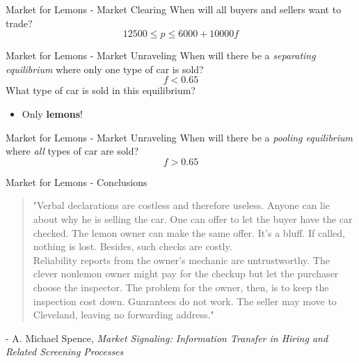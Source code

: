 
\begin{frame}{Market for Lemons - Market Clearing}
  When will all buyers and sellers want to trade?
  \pause
  $$12500 \leq p \leq 6000 + 10000f$$
\end{frame}


\begin{frame}{Market for Lemons - Market Unraveling}
  When will there be a \textit{separating equilibrium}
  where only one type of car is sold?
  \pause
  $$f < 0.65$$
  \pause
  What type of car is sold in this equilibrium?
  \begin{itemize}
    \item Only \textbf{lemons}!
  \end{itemize}
\end{frame}


\begin{frame}{Market for Lemons - Market Unraveling}
  When will there be a \textit{pooling equilibrium}
  where \textit{all} types of car are sold?
  \pause
  $$f > 0.65$$
  \pause
\end{frame}


\begin{frame}{Market for Lemons - Conclusions}
  \begin{quote}
    \small{
    "Verbal declarations are costless and therefore useless. Anyone can lie about why he is selling the car. 
    One can offer to let the buyer have the car checked. The lemon owner can make the same offer. It’s a bluff. If called, nothing is lost. Besides, such checks are costly. \\
    Reliability reports from the owner’s mechanic are untrustworthy. The clever nonlemon owner might pay for the checkup but let the purchaser choose the inspector. The problem for the owner, then, is to keep the inspection cost down. 
    Guarantees do not work. The seller may move to Cleveland, leaving no forwarding address." 
    }
  \end{quote} 
   \footnotesize{- A. Michael Spence, \textit{Market Signaling: Information Transfer in Hiring and Related Screening Processes}}
\end{frame}


